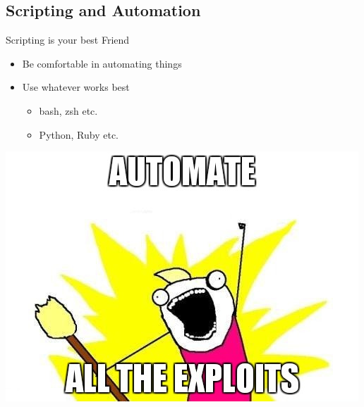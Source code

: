 



\subsection{Scripting and Automation}

\begin{frame}
  {Scripting is your best Friend}

  \begin{itemize}
    \item Be comfortable in automating things
    \item Use whatever works best
      \begin{itemize}
        \item bash, zsh etc.
        \item Python, Ruby etc.
      \end{itemize}
  \end{itemize}

  \begin{center}
    \includegraphics[height=0.5\textheight]{./images/automatealltheexploits.jpg}
  \end{center}
\end{frame}


